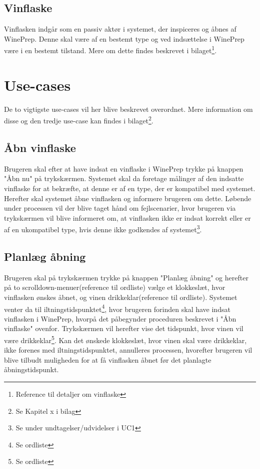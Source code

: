 \subsection{Vinflaske}
Vinflasken indgår som en passiv aktør i systemet, der inspiceres og åbnes af WinePrep. Denne skal være af en bestemt type og ved indsættelse i WinePrep være i 
en bestemt tilstand. Mere om dette findes beskrevet i bilaget\footnote{Reference til detaljer om vinflaske}.

\section{Use-cases}
De to vigtigste use-cases vil her blive beskrevet overordnet. Mere information om disse og den tredje use-case kan findes i bilaget\footnote{Se Kapitel x i bilag}.

\subsection{Åbn vinflaske}
Brugeren skal efter at have indsat en vinflaske i WinePrep trykke på knappen "Åbn nu" på trykskærmen. Systemet skal da foretage målinger af den indsatte 
vinflaske for at bekræfte, at denne er af en type, der er kompatibel med systemet. Herefter skal systemet åbne vinflasken og informere brugeren om dette. 
Løbende under processen vil der blive taget hånd om fejlscenarier, hvor brugeren via trykskærmen vil blive informeret om, at vinflasken ikke er indsat korrekt 
eller er af en ukompatibel type, hvis denne ikke godkendes af systemet\footnote{Se under undtagelser/udvidelser i UC1}.

\subsection{Planlæg åbning}
Brugeren skal på trykskærmen trykke på knappen "Planlæg åbning" og herefter på to scrolldown-menuer(reference til ordliste) vælge et klokkeslæt, hvor 
vinflasken ønskes åbnet, og vinen drikkeklar(reference til ordliste). Systemet venter da til iltningstidspunktet\footnote{Se ordliste}, hvor brugeren 
forinden skal have indsat vinflasken i WinePrep, hvorpå det påbegynder proceduren beskrevet i "Åbn vinflaske" ovenfor. Trykskærmen vil herefter vise det 
tidspunkt, hvor vinen vil være drikkeklar\footnote{Se ordliste}. Kan det ønskede klokkeslæt, hvor vinen skal være drikkeklar, ikke forenes med iltningstidspunktet, annulleres processen, hvorefter brugeren vil blive tilbudt muligheden for at få vinflasken åbnet før det planlagte
åbningstidspunkt.

